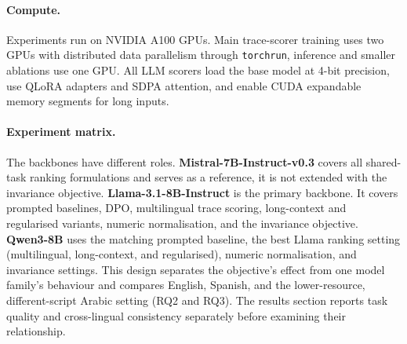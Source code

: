 \paragraph{Compute.}
Experiments run on NVIDIA A100 GPUs. Main trace-scorer training uses two GPUs with distributed data
parallelism through \texttt{torchrun}, inference and smaller ablations use one GPU. All LLM scorers
load the base model at 4-bit precision, use QLoRA adapters and SDPA attention, and enable CUDA
expandable memory segments for long inputs.

\paragraph{Experiment matrix.}
The backbones have different roles. \textbf{Mistral-7B-Instruct-v0.3} covers all shared-task ranking
formulations and serves as a reference, it is not extended with the invariance objective.
\textbf{Llama-3.1-8B-Instruct} is the primary backbone. It covers prompted baselines, DPO,
multilingual trace scoring, long-context and regularised variants, numeric normalisation, and the
invariance objective. \textbf{Qwen3-8B} uses the matching prompted baseline, the best Llama ranking
setting (multilingual, long-context, and regularised), numeric normalisation, and invariance settings.
This design separates the objective's effect from one model family's behaviour and compares English,
Spanish, and the lower-resource, different-script Arabic setting (RQ2 and RQ3). The results section
reports task quality and cross-lingual consistency separately before examining their relationship.
